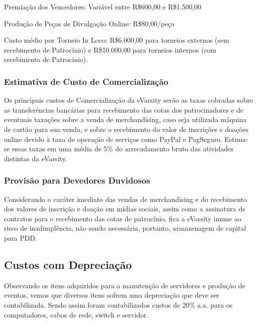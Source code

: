 \documentclass[a4paper, 12pt]{paper}
\begin{document}
Premiação dos Vencedores: Variável entre R\$600,00 e R\$1.500,00

Produção de Peças de Divulgação Online: R\$80,00/peça
	
Custo médio por Torneio In Loco: R\$6.000,00 para torneios externos (sem recebimento de Patrocínio) e R\$10.000,00 para torneios internos (com recebimento de Patrocínio).

\subsubsection{Estimativa de Custo de Comercialização}
Os principais custos de Comercialização da eVarsity serão as taxas cobradas sobre as transferências bancárias para recebimento das cotas dos patrocinadores e de eventuais taxações sobre a venda de merchandising, caso seja utilizada máquina de cartão para sua venda, e sobre o recebimento do valor de inscrições e doações online devido à taxa de operação de serviços como PayPal e PagSeguro. Estima-se essas taxas em uma média de 5\% do arrecadamento bruto das atividades distintas da eVarsity.

\subsubsection{Provisão para Devedores Duvidosos}
Considerando o caráter imediato das vendas de merchandising e do recebimento dos valores de inscrição e doação em mídias sociais, assim como a assinatura de contratos para o recebimento das cotas de patrocínio, fica a eVarsity imune ao risco de inadimplência, não sendo necessária, portanto, armazenagem de capital para PDD.

\subsection{Custos com Depreciação}
Observando os itens adquiridos para a manutenção de servidores e produção de eventos, vemos que diversos itens sofrem uma depreciação que deve ser contabilizada. Sendo assim foram contabilizados custos de 20\% a.a. para os computadores, cabos de rede, switch e servidor.
\end{document}
